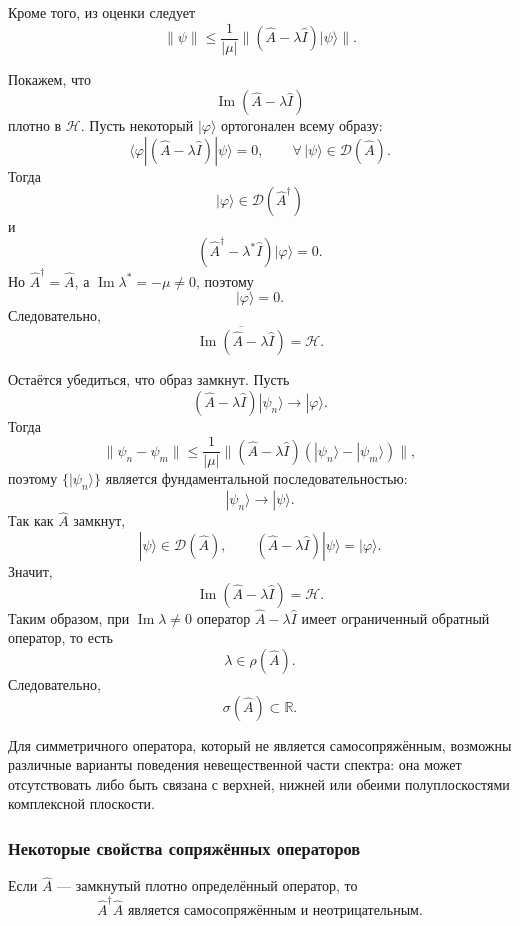 \documentclass[12pt,a4paper]{article}
\begin{document}
Кроме того, из оценки следует
\[
    \|\psi\|
    \leq
    \frac{1}{|\mu|}
    \|(\hat A-\lambda\hat I)|\psi\rangle\|.
\]

Покажем, что
\[
    \operatorname{Im}(\hat A-\lambda\hat I)
\]
плотно в $\mathcal H$. Пусть некоторый $|\varphi\rangle$ ортогонален
всему образу:
\[
    \langle\varphi|
    (\hat A-\lambda\hat I)
    |\psi\rangle
    =
    0,
    \qquad
    \forall\,|\psi\rangle\in\mathcal D(\hat A).
\]
Тогда
\[
    |\varphi\rangle\in\mathcal D(\hat A^\dagger)
\]
и
\[
    (\hat A^\dagger-\lambda^*\hat I)|\varphi\rangle=0.
\]
Но $\hat A^\dagger=\hat A$, а $\operatorname{Im}\lambda^*=-\mu\neq0$,
поэтому
\[
    |\varphi\rangle=0.
\]
Следовательно,
\[
    \overline{
        \operatorname{Im}(\hat A-\lambda\hat I)
    }
    =
    \mathcal H.
\]

Остаётся убедиться, что образ замкнут. Пусть
\[
    (\hat A-\lambda\hat I)|\psi_n\rangle
    \longrightarrow
    |\varphi\rangle.
\]
Тогда
\[
    \|\psi_n-\psi_m\|
    \leq
    \frac{1}{|\mu|}
    \|
        (\hat A-\lambda\hat I)
        (|\psi_n\rangle-|\psi_m\rangle)
    \|,
\]
поэтому $\{|\psi_n\rangle\}$ является фундаментальной
последовательностью:
\[
    |\psi_n\rangle\longrightarrow|\psi\rangle.
\]
Так как $\hat A$ замкнут,
\[
    |\psi\rangle\in\mathcal D(\hat A),
    \qquad
    (\hat A-\lambda\hat I)|\psi\rangle
    =
    |\varphi\rangle.
\]
Значит,
\[
    \operatorname{Im}(\hat A-\lambda\hat I)=\mathcal H.
\]
Таким образом, при $\operatorname{Im}\lambda\neq0$ оператор
$\hat A-\lambda\hat I$ имеет ограниченный обратный оператор, то есть
\[
    \lambda\in\rho(\hat A).
\]
Следовательно,
\[
    \sigma(\hat A)\subset\mathbb R.
\]

Для симметричного оператора, который не является самосопряжённым,
возможны различные варианты поведения невещественной части спектра:
она может отсутствовать либо быть связана с верхней, нижней или обеими
полуплоскостями комплексной плоскости.


\subsubsection{Некоторые свойства сопряжённых операторов}

Если $\hat A$ --- замкнутый плотно определённый оператор, то
\[
    \boxed{
        \hat A^\dagger\hat A
        \text{ является самосопряжённым и неотрицательным}
    }.
\]
\end{document}
